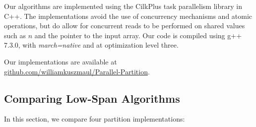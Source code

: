 \documentclass[sigconf]{acmart}
\newcommand{\github}{\url{github.com/williamkuszmaul/Parallel-Partition}}
\theoremstyle{remark}
\theoremstyle{remark}
\begin{document}
Our algorithms are implemented using the CilkPlus task parallelism
library in C++. The implementations avoid the use of concurrency
mechanisms and atomic operations, but do allow for concurrent reads to
be performed on shared values such as $n$ and the pointer to the input
array. Our code is compiled using g++ 7.3.0, with \emph{march=native}
and at optimization level three. 

Our implementations are available at \\ \github.


\subsection{Comparing Low-Span Algorithms}\label{subseclowspan}

In this section, we compare four partition implementations:
\end{document}
